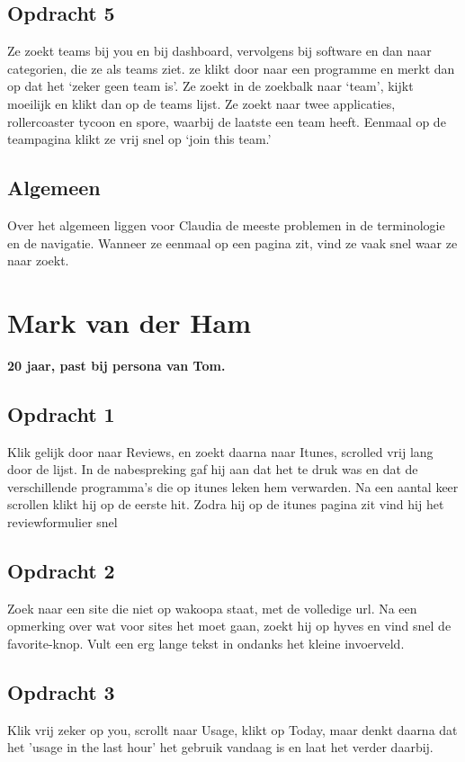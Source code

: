 \subsection{Opdracht 5}
 Ze zoekt teams bij you en bij dashboard, vervolgens bij software en dan naar categorien, die ze als teams ziet. ze klikt door naar een programme en merkt dan op dat het `zeker geen team is'. Ze zoekt in de zoekbalk naar `team', kijkt moeilijk en klikt dan op de teams lijst. Ze zoekt naar twee applicaties, rollercoaster tycoon en spore, waarbij de laatste een team heeft. Eenmaal op de teampagina klikt ze vrij snel op `join this team.'

 \subsection{Algemeen}
  Over het algemeen liggen voor Claudia de meeste problemen in de terminologie en de navigatie. Wanneer ze eenmaal op een pagina zit, vind ze vaak snel waar ze naar zoekt.

\section{Mark van der Ham}
\textbf{20 jaar, past bij persona van Tom.}

\subsection{Opdracht 1}
Klik gelijk door naar Reviews, en zoekt daarna naar Itunes, scrolled vrij lang door de lijst. In de nabespreking gaf hij aan dat het te druk was en dat de verschillende programma's die op itunes leken hem verwarden. Na een aantal keer scrollen klikt hij op de eerste hit. Zodra hij op de itunes pagina zit vind hij het reviewformulier snel

\subsection{Opdracht 2}
Zoek naar een site die niet op wakoopa staat, met de volledige url. Na een opmerking over wat voor sites het moet gaan, zoekt hij op hyves en vind snel de favorite-knop. Vult een erg lange tekst in ondanks het kleine invoerveld.

\subsection{Opdracht 3}
Klik vrij zeker op you, scrollt naar Usage, klikt op Today, maar denkt daarna dat het 'usage in the last hour' het gebruik vandaag is en laat het verder daarbij.

